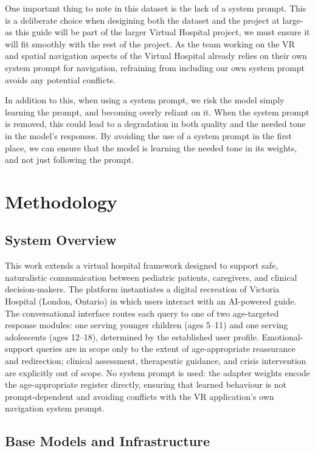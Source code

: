 \documentclass[journal]{IEEEtai}
\begin{document}
One important thing to note in this dataset is the lack of a system prompt. This is a deliberate choice when desigining both the dataset and the project at large- as this guide will be part of the larger Virtual Hospital project, we must ensure it will fit smoothly with the rest of the project. As the team working on the VR and spatial navigation aspects of the Virtual Hospital already relies on their own system prompt for navigation, refraining from including our own system prompt avoids any potential conflicts.

In addition to this, when using a system prompt, we risk the model simply learning the prompt, and becoming overly reliant on it. When the system prompt is removed, this could lead to a degradation in both quality and the needed tone in the model's responses. By avoiding the use of a system prompt in the first place, we can ensure that the model is learning the needed tone in its weights, and not just following the prompt.

\section{Methodology}\label{sec:methodology}

\subsection{System Overview}

This work extends a virtual hospital framework designed to support safe, naturalistic communication between pediatric patients, caregivers, and clinical decision-makers. The platform instantiates a digital recreation of Victoria Hospital (London, Ontario) in which users interact with an AI-powered guide. The conversational interface routes each query to one of two age-targeted response modules: one serving younger children (ages 5--11) and one serving adolescents (ages 12--18), determined by the established user profile. Emotional-support queries are in scope only to the extent of age-appropriate reassurance and redirection; clinical assessment, therapeutic guidance, and crisis intervention are explicitly out of scope. No system prompt is used: the adapter weights encode the age-appropriate register directly, ensuring that learned behaviour is not prompt-dependent and avoiding conflicts with the VR application's own navigation system prompt.

\subsection{Base Models and Infrastructure}
\end{document}
